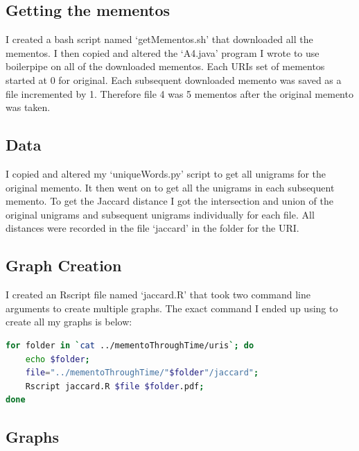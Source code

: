 \documentclass[12pt]{article}
\begin{document}
\subsection{Getting the mementos}
I created a bash script named `getMementos.sh' that downloaded all the mementos.  I then copied and altered the `A4.java' program I wrote to use boilerpipe on all of the downloaded mementos. Each URIs set of mementos started at 0 for original. Each subsequent downloaded memento was saved as a file incremented by 1.  Therefore file 4 was 5 mementos after the original memento was taken.

\subsection{Data}
I copied and altered my `uniqueWords.py' script to get all unigrams for the original memento.  It then went on to get all the unigrams in each subsequent memento.  To get the Jaccard distance I got the intersection and union of the original unigrams and subsequent unigrams individually for each file.  All distances were recorded in the file `jaccard' in the folder for the URI.

\subsection{Graph Creation}
I created an Rscript file named `jaccard.R' that took two command line arguments to create multiple graphs.  The exact command I ended up using to create all my graphs is below:

\begin{lstlisting}[language=bash]
for folder in `cat ../mementoThroughTime/uris`; do 
    echo $folder; 
    file="../mementoThroughTime/"$folder"/jaccard"; 
    Rscript jaccard.R $file $folder.pdf;
done
\end{lstlisting}

\subsection{Graphs}
\end{document}
